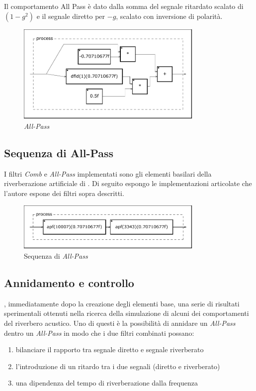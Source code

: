 

Il comportamento All Pass è dato dalla somma del segnale ritardato scalato di
$(1-g^2)$ e il segnale diretto per $-g$, scalato con inversione di polarità.

\begin{figure}[htp]
\centering
\includegraphics[width=0.80\textwidth]{Code/msapf-svg/process.pdf}
\caption{\emph{All-Pass}}
\label{fig:apfaust}
\end{figure}

\subsection{Sequenza di All-Pass}

I filtri \emph{Comb} e \emph{All-Pass} implementati sono gli elementi basilari
della riverberazione artificiale di \ms. Di seguito espongo le implementazioni
articolate che l'autore espone dei filtri sopra descritti.



\begin{figure}[htp]
\centering
\includegraphics[width=0.80\textwidth]{Code/msapfseq-svg/process.pdf}
\caption{Sequenza di \emph{All-Pass}}
\label{fig:apfseq}
\end{figure}

\subsection{Annidamento e controllo}

\ms, immediatamente dopo la creazione degli elementi base, una serie di risultati
sperimentali ottenuti nella ricerca della simulazione di alcuni dei comportamenti
del riverbero acustico. Uno di questi è la possibilità di annidare un \emph{All-Pass}
dentro un \emph{All-Pass} in modo che i due filtri combinati possano:
\begin{enumerate}
  \item bilanciare il rapporto tra segnale diretto e segnale riverberato
  \item l'introduzione di un ritardo tra i due segnali (diretto e riverberato)
  \item una dipendenza del tempo di riverberazione dalla frequenza
\end{enumerate}

